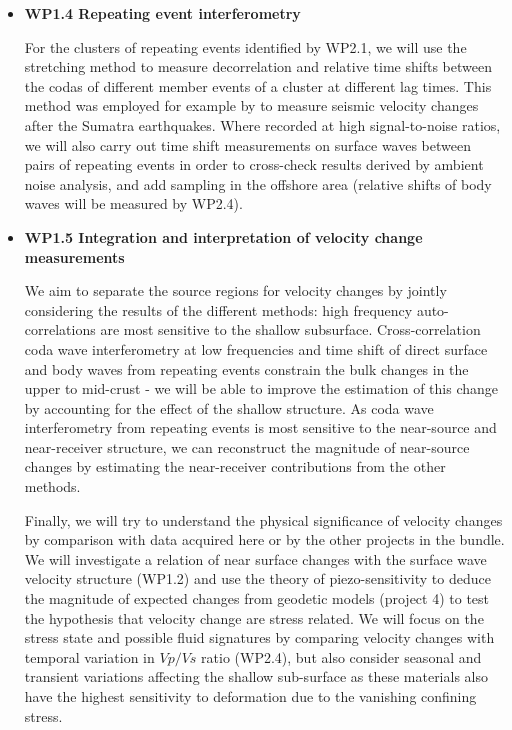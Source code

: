 \documentclass[11pt]{article}
\begin{document}
\begin{itemize}
\item
{\bf WP1.4 Repeating event interferometry}

For the clusters of repeating events identified by WP2.1, we will use the stretching method to measure decorrelation and relative time shifts between the codas of different member events of a cluster at different lag times. This method was employed for example by \citet{yu13_temporal} to measure seismic velocity changes after the Sumatra earthquakes. 
Where recorded at high signal-to-noise ratios, we will also carry out time shift measurements on surface waves between pairs of repeating events in order to cross-check results derived by ambient noise analysis, and add sampling in the offshore area (relative shifts of body waves will be measured by WP2.4). 

\item 
{\bf WP1.5 Integration and interpretation of velocity change measurements}

We aim to separate the source regions for velocity changes by jointly considering the results of the different methods: high frequency auto-correlations are most sensitive to the shallow subsurface. Cross-correlation coda wave interferometry at low frequencies and time shift of direct surface and body waves from repeating events constrain the bulk changes in the upper to mid-crust - we will be able to improve the estimation of this change by accounting for the effect of the shallow structure.
As coda wave interferometry from repeating events is most sensitive to the near-source and near-receiver structure, we  can reconstruct the magnitude of near-source changes by estimating the near-receiver contributions from the other methods. 

Finally, we will try to understand the physical significance of velocity changes by comparison with data acquired here or by the other projects in the bundle. We will investigate a relation of near surface changes with the surface wave velocity structure (WP1.2) and use the theory of piezo-sensitivity to deduce the magnitude of expected changes from geodetic models (project 4) to test the hypothesis that velocity change are stress related. We will focus on the stress state and possible fluid signatures by comparing velocity changes with temporal variation in $Vp/Vs$ ratio (WP2.4), but also consider seasonal and transient variations affecting the shallow sub-surface as these materials also have the highest sensitivity to deformation due to the vanishing confining stress.
\end{itemize}
\end{document}
